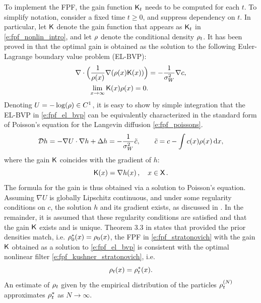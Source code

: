 To implement the FPF, the gain function $\text{\sf K}_t$ needs to be computed for each $t$. To simplify notation, consider a fixed time $t\ge 0$,  and suppress dependency on $t$.  In particular, let $\text{\sf K}$ denote the gain function that appears as  $ \text{\sf K}_t$  in \eqref{e:fpf_nonlin_intro},  and let $\rho$ denote the conditional density $\rho_t$. It has been proved in \cite{yanmehmey13} that the optimal gain is obtained as the solution to the following Euler-Lagrange boundary value problem (EL-BVP):
\begin{equation}
\begin{aligned}
\nabla \cdot \Bigl(\frac{1}{\pr(x)} \nabla (\pr(x) \kFPF(x))\Bigr) &= - \frac{1}{\sigma^2_W} \nabla c, \\
\lim_{x \to \infty} \kFPF(x) \pr(x) = 0.
\label{e:fpf_el_bvp}
\end{aligned}
\end{equation}%
Denoting $U=-\log(\rho)\in C^1$, it is easy to show by simple integration that the EL-BVP in \eqref{e:fpf_el_bvp} can be equivalently characterized in the standard form of Poisson's equation for the Langevin diffusion \eqref{e:fpf_poissons}.
\begin{equation}
\generate h = -\nabla \pot \cdot \nabla h + \Delta h  = -\frac{1}{\sigma_W^2}\tilc, \qquad \tilc = c - \int c(x) \pr(x)\, \ud x, 
\label{e:fpf_poissons}
\end{equation}
where the gain $\text{\sf K}$ coincides with the gradient of $h$:
\begin{equation}
\kFPF (x) = \nabla h(x)\, ,  \quad x\in\state\, .
\label{e:fpf_k_gradient}
\end{equation}
The formula for the gain is thus obtained via a solution to Poisson's equation.
Assuming $\nabla U$ is globally Lipschitz continuous, and under some regularity conditions on $c$, the solution $h$ and its gradient exists, as discussed in . In the remainder, it is assumed that these regularity conditions are satisfied and that the gain $\text{\sf K}$ exists and is unique. Theorem 3.3 in \cite{yanmehmey13} states that provided the prior densities match, i.e. $\rho^*_0(x) = \rho_0(x)$, the FPF in \eqref{e:fpf_stratonovich} with the gain $\text{\sf K}$ obtained as a solution to \eqref{e:fpf_el_bvp} is consistent with the optimal nonlinear filter \eqref{e:fpf_kushner_stratonovich}, i.e.
\begin{equation}
\rho_t(x) = \rho^*_t(x). 
\end{equation}
An estimate of $\rho_t$ given by the empirical distribution of the particles $\rho^{(N)}_t$ approximates $\rho^*_t$ as $N \to \infty$. 

